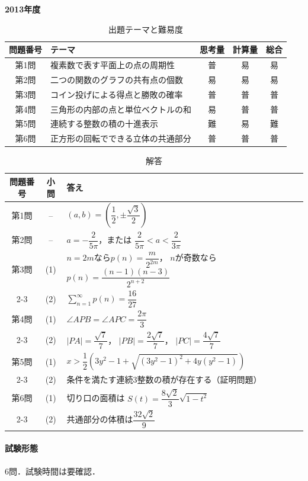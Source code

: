 \documentclass[../../main.tex]{subfiles}
\begin{document}
\begin{center}
  {\fontsize{48pt}{58pt}\selectfont \textbf{2013}\normalsize\textbf{年度}}
\end{center}

\begin{table}[htb]
  \centering
  \caption{出題テーマと難易度}
  \begin{tabular}{|c|p{6.2cm}|c|c|c|}
    \hline
    \textbf{問題番号} & \textbf{テーマ} & \textbf{思考量} & \textbf{計算量} & \textbf{総合} \\
    \hline
    第1問 & 複素数で表す平面上の点の周期性 & 普 & 易 & 易 \\
    \hline
    第2問 & 二つの関数のグラフの共有点の個数 & 易 & 易 & 易 \\
    \hline
    第3問 & コイン投げによる得点と勝敗の確率 & 普 & 普 & 普 \\
    \hline
    第4問 & 三角形の内部の点と単位ベクトルの和 & 易 & 普 & 普 \\
    \hline
    第5問 & 連続する整数の積の十進表示 & 難 & 易 & 難 \\
    \hline
    第6問 & 正方形の回転でできる立体の共通部分 & 普 & 普 & 普 \\
    \hline
  \end{tabular}
\end{table}

\begin{table}[htb]
  \centering
  \caption{解答}
  \renewcommand{\arraystretch}{1.4}
  \begin{tabular}{|c|c|p{9cm}|}
    \hline
    \textbf{問題番号} & \textbf{小問} & \textbf{答え} \\
    \hline
    第1問 & -- & $(a,b)=\left(\dfrac{1}{2},
    \pm\dfrac{\sqrt{3}}{2}\right)$ \\
    \hline
    第2問 & -- & $a=-\dfrac{2}{5\pi}$，または
    $\dfrac{2}{5\pi}<a<\dfrac{2}{3\pi}$ \\
    \hline
    第3問 & (1) & $n=2m$なら$p(n)=\dfrac{m}{2^{2m}}$，
    $n$が奇数なら$p(n)=\dfrac{(n-1)(n-3)}{2^{n+2}}$ \\
    \cline{2-3}
    & (2) & $\displaystyle\sum_{n=1}^{\infty}p(n)=\dfrac{16}{27}$ \\
    \hline
    第4問 & (1) & $\angle APB=\angle APC=\dfrac{2\pi}{3}$ \\
    \cline{2-3}
    & (2) & $|PA|=\dfrac{\sqrt{7}}{7}$，
    $|PB|=\dfrac{2\sqrt{7}}{7}$，
    $|PC|=\dfrac{4\sqrt{7}}{7}$ \\
    \hline
    第5問 & (1) & $x>\dfrac{1}{2}\left(3y^2-1+
    \sqrt{(3y^2-1)^2+4y(y^2-1)}\right)$ \\
    \cline{2-3}
    & (2) & 条件を満たす連続3整数の積が存在する（証明問題） \\
    \hline
    第6問 & (1) & 切り口の面積は
    $S(t)=\dfrac{8\sqrt{2}}{3}\sqrt{1-t^2}$ \\
    \cline{2-3}
    & (2) & 共通部分の体積は$\dfrac{32\sqrt{2}}{9}$ \\
    \hline
  \end{tabular}
\end{table}

\paragraph{試験形態}
6問．試験時間は要確認．
\end{document}

